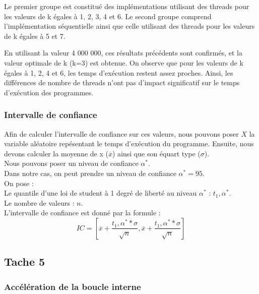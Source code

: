 \documentclass[
]{article}
\begin{document}
Le premier groupe est constitué des implémentations utilisant des
threads pour les valeurs de k égales à 1, 2, 3, 4 et 6. Le second groupe
comprend l'implémentation séquentielle ainsi que celle utilisant des
threads pour les valeurs de k égales à 5 et 7.

En utilisant la valeur 4 000 000, ces résultats précédents sont
confirmés, et la valeur optimale de k (k=3) est obtenue. On observe que
pour les valeurs de k égales à 1, 2, 4 et 6, les temps d'exécution
restent assez proches. Ainsi, les différences de nombre de threads n'ont
pas d'impact significatif sur le temps d'exécution des programmes.

\hypertarget{intervalle-de-confiance}{%
\subsubsection{Intervalle de confiance}\label{intervalle-de-confiance}}

Afin de calculer l'intervalle de confiance sur ces valeurs, nous pouvons
poser \(X\) la variable aléatoire repésentant le temps d'exécution du
programme. Ensuite, nous devons calculer la moyenne de x
(\(\overline{x}\)) ainsi que son équart type (\(\sigma\)).\\
Nous pouvons poser un niveau de confiance \(\alpha^{*}\).\\
Dans notre cas, on peut prendre un niveau de confiance
\(\alpha^{*} = 95%
\).\\
On pose :\\
Le quantile d'une loi de student à 1 degré de liberté au niveau
\(\alpha^{*}\) : \(t_1,\alpha^{*}\).\\
Le nombre de valeurs : \(n\).\\
L'intervalle de confiance est donné par la formule :\\
\begin{equation}
IC = [\overline{x} + \frac{t_1,\alpha^{*}* \sigma }{ \sqrt{n}}, \overline{x} + \frac{t_1,\alpha^{*} * \sigma }{ \sqrt{n}}]
\end{equation}

\hypertarget{tache-5}{%
\subsection{Tache 5}\label{tache-5}}

\hypertarget{accuxe9luxe9ration-de-la-boucle-interne}{%
\subsubsection{Accélération de la boucle
interne}\label{accuxe9luxe9ration-de-la-boucle-interne}}
\end{document}
